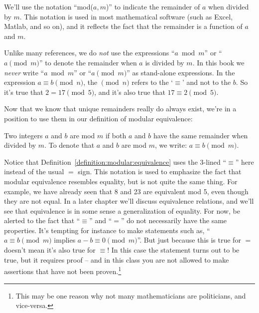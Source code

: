We'll use the notation ``mod($a,m$)'' to indicate the remainder of $a$ when divided by $m$.  This notation  is used in most mathematical software (such as Excel, Matlab, and so on), and it reflects the fact that the remainder is a function of $a$ and $m$. 

\begin{rem} Unlike many  references, we do \emph{not} use the expressions  ``$a \bmod m$'' or ``$a \pmod m$'' to denote the remainder when $a$ is divided by $m$.  In this book we \emph{never} write  ``$a \bmod m$'' or ``$a \pmod m$'' as stand-alone expressions.   In the expression $a \equiv b \pmod n$, the $\pmod n$ refers to the `$\equiv$' and not to the $b$. So it's true that $2 = 17 \pmod 5$, and it's also true that $17 \equiv 2 \pmod{5}$.  
\end{rem}

Now that we know that unique remainders really do always exist, we're in a position to use them in our definition of modular equivalence: 

\begin{defn}\label{definition:modular:equivalence}
 Two integers $a$ and $b$ are  mod $m$  if both $a$ and $b$ have the same remainder when divided by $m$. To denote that $a$ and $b$ are  mod $m$, we write: $a \equiv b \pmod{m}$.
 \end{defn}

\begin{rem}
Notice that Definition~\ref{definition:modular:equivalence} uses the 3-lined ``$\equiv$'' here instead of the usual $=$ sign. This notation is used  to emphasize the fact that modular equivalence resembles equality, but is not quite the same thing.  For example, we have already seen that 8 and 23 are equivalent mod 5, even though they are not equal.  In a later chapter we'll discuss equivalence relations, and we'll see that equivalence is in some sense a generalization of equality. For now,  be alerted to the fact that ``$\equiv$'' and ``$=$'' do not necessarily have the same properties. It's tempting for instance to make statements such as, ``$a \equiv b \pmod{m}$ implies $a-b \equiv 0 \pmod{m}$''. But just because this is true for $=$ doesn't mean it's also true for $\equiv$!  In this case the statement turns out to be true, but it requires proof -- and in this class you are not allowed to make assertions that have not been proven.\footnote{This may be one reason why not many mathematicians are politicians, and vice-versa.}  
\end{rem}


